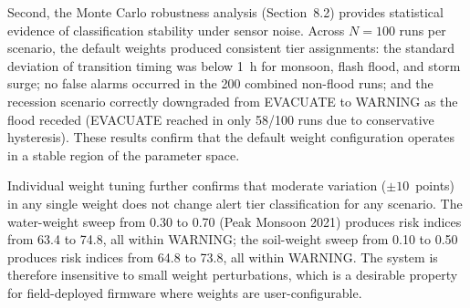\documentclass[5p,twocolumn]{elsarticle}
\begin{document}
\begin{table}[htbp]
  \caption{Weight sensitivity analysis. Each weight set was tested against six historical scenarios (Dry Season, Monsoon Onset, Low Monsoon 2018, Near-Miss 2020, Peak Monsoon 2021, and 1998 Flood). Only the default set produces correct tier assignments for all scenarios.}
  \label{tab:sensitivity}
  \centering
  \footnotesize
  \setlength{\tabcolsep}{2pt}
\end{table}

Second, the Monte Carlo robustness analysis (Section~8.2) provides statistical evidence of classification stability under sensor noise. Across $N=100$ runs per scenario, the default weights produced consistent tier assignments: the standard deviation of transition timing was below 1~h for monsoon, flash flood, and storm surge; no false alarms occurred in the 200 combined non-flood runs; and the recession scenario correctly downgraded from EVACUATE to WARNING as the flood receded (EVACUATE reached in only 58/100 runs due to conservative hysteresis). These results confirm that the default weight configuration operates in a stable region of the parameter space.

Individual weight tuning further confirms that moderate variation ($\pm10$~points) in any single weight does not change alert tier classification for any scenario. The water-weight sweep from 0.30 to 0.70 (Peak Monsoon 2021) produces risk indices from 63.4 to 74.8, all within WARNING; the soil-weight sweep from 0.10 to 0.50 produces risk indices from 64.8 to 73.8, all within WARNING. The system is therefore insensitive to small weight perturbations, which is a desirable property for field-deployed firmware where weights are user-configurable.
\end{document}
